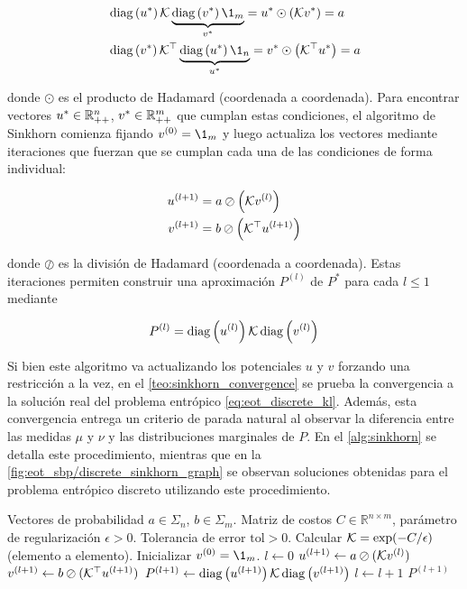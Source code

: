 \begin{align*}
	&\diag{u^*}\gibbs\underbrace{\diag{v^*} \1_m}_{v^*} = u^* \odot \parent{\gibbs v^*} = a\\
	&\diag{v^*}\gibbs^\top\underbrace{\diag{u^*} \1_n}_{u^*} = v^* \odot \parent{\gibbs^\top u^*} = a 
\end{align*}

donde $\odot$ es el producto de Hadamard (coordenada a coordenada). Para encontrar vectores $u^*\in\mathbb{R}^n_{++}$, $v^*\in\mathbb{R}^m_{++}$ que cumplan estas condiciones, el algoritmo de Sinkhorn comienza fijando $v^{(0)}=\1_m$ y luego actualiza los vectores mediante iteraciones que fuerzan que se cumplan cada una de las condiciones de forma individual:

\begin{align}
	u^{(l+1)} &= a \oslash \left(\mathcal{K} v^{(l)}\right)\label{eq:sinkhorn_u_update}\\
	v^{(l+1)} &= b \oslash \left(\mathcal{K}^\top u^{(l+1)}\right)\label{eq:sinkhorn_v_update}
\end{align}

donde $\oslash$ es la división de Hadamard (coordenada a coordenada). Estas iteraciones permiten construir una aproximación $P^{(l)}$ de $P^*$ para cada $l\leq 1$ mediante

\begin{equation*}
	P^{(l)} = \operatorname{diag}\left(u^{(l)}\right)\mathcal{K}\operatorname{diag}\left(v^{(l)}\right)
\end{equation*}

Si bien este algoritmo va actualizando los potenciales $u$ y $v$ forzando una restricción a la vez, en el \autoref{teo:sinkhorn_convergence} se prueba la convergencia a la solución real del problema entrópico \eqref{eq:eot_discrete_kl}. Además, esta convergencia entrega un criterio de parada natural al observar la diferencia entre las medidas $\mu$ y $\nu$ y las distribuciones marginales de $P$. En el \autoref{alg:sinkhorn} se detalla este procedimiento, mientras que en la \autoref{fig:eot_sbp/discrete_sinkhorn_graph} se observan soluciones obtenidas para el problema entrópico discreto utilizando este procedimiento.

\begin{algorithm}
	\caption{Algoritmo de Sinkhorn}
   \label{alg:sinkhorn}
   \begin{algorithmic}[1]
   \Require Vectores de probabilidad $a\in\Sigma_n$, $b\in\Sigma_m$.
   \Require Matriz de costos $C\in\mathbb{R}^{n\times m}$, parámetro de regularización $\epsilon > 0$.
   \Require Tolerancia de error $\text{tol} > 0$.
   \State Calcular $\mathcal{K} = \exp(-C/\epsilon)$ (elemento a elemento).
   \State Inicializar $v^{(0)} = \1_m$.
   \State $l \gets 0$
	   \State $u^{(l+1)} \gets a \oslash (\mathcal{K} v^{(l)})$
	   \State $v^{(l+1)} \gets b \oslash (\mathcal{K}^\top u^{(l+1)})$
	   \State $P^{(l+1)} \gets \operatorname{diag}\left(u^{(l+1)}\right)\mathcal{K}\operatorname{diag}\left(v^{(l+1)}\right)$
	   \State $l \gets l + 1$
   \EndWhile
   \State \Return $P^{(l+1)}$
   \end{algorithmic}
   \end{algorithm}

